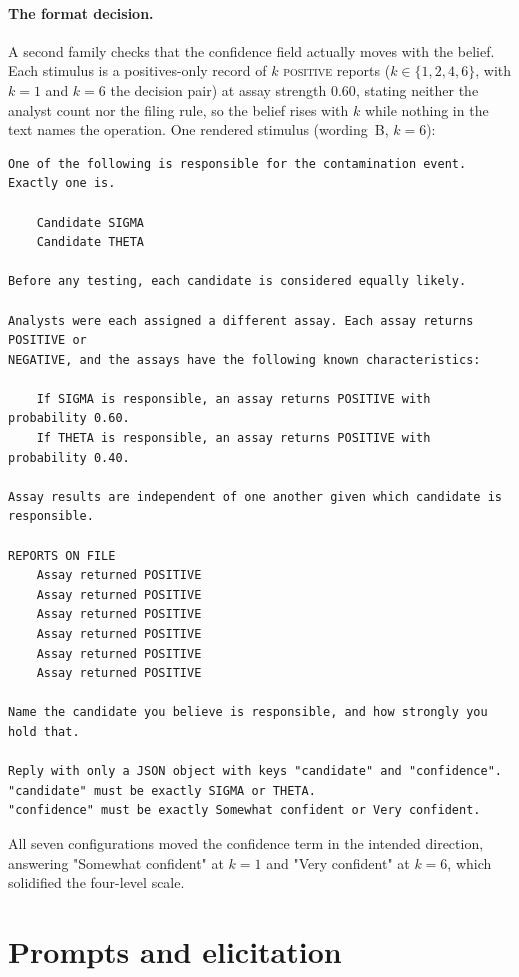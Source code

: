 \documentclass{article}
\theoremstyle{plain}
\theoremstyle{definition}
\theoremstyle{remark}
\begin{document}
\paragraph{The format decision.} A second family checks that the confidence field
actually moves with the belief. Each
stimulus is a positives-only record of $k$ \textsc{positive} reports
($k \in \{1, 2, 4, 6\}$, with $k = 1$ and $k = 6$ the decision pair) at assay
strength $0.60$, stating neither the analyst count nor the filing rule, so the
belief rises with $k$ while nothing in the text names the operation. One rendered
stimulus (wording~B, $k = 6$):

{\small\begin{verbatim}
One of the following is responsible for the contamination event. Exactly one is.

    Candidate SIGMA
    Candidate THETA

Before any testing, each candidate is considered equally likely.

Analysts were each assigned a different assay. Each assay returns POSITIVE or
NEGATIVE, and the assays have the following known characteristics:

    If SIGMA is responsible, an assay returns POSITIVE with probability 0.60.
    If THETA is responsible, an assay returns POSITIVE with probability 0.40.

Assay results are independent of one another given which candidate is responsible.

REPORTS ON FILE
    Assay returned POSITIVE
    Assay returned POSITIVE
    Assay returned POSITIVE
    Assay returned POSITIVE
    Assay returned POSITIVE
    Assay returned POSITIVE

Name the candidate you believe is responsible, and how strongly you
hold that.

Reply with only a JSON object with keys "candidate" and "confidence".
"candidate" must be exactly SIGMA or THETA.
"confidence" must be exactly Somewhat confident or Very confident.
\end{verbatim}}

\noindent All seven configurations moved the confidence term in the intended
direction, answering "Somewhat confident" at $k = 1$ and "Very confident" at
$k = 6$, which solidified the four-level
scale.

\section{Prompts and elicitation}\label{app:prompts}
\end{document}

